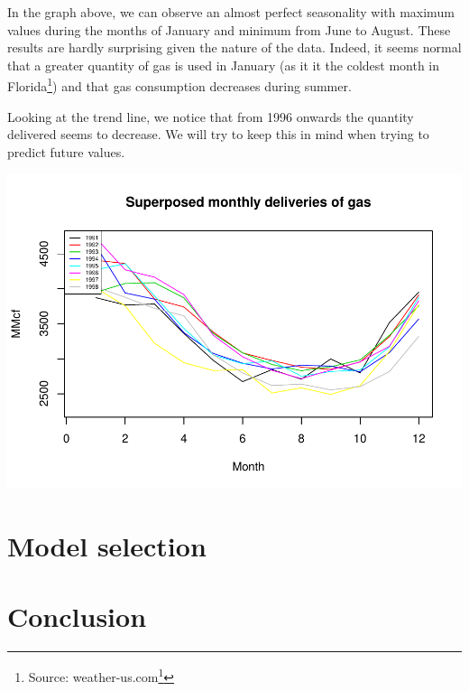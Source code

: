 \documentclass[a4paper, 12pt]{article}
\renewcommand{\href}[2]{#2\footnote{\url{#1}}}
\begin{document}
    In the graph above, we can observe an almost perfect seasonality with
    maximum values during the months of January and minimum from June to
    August. These results are hardly surprising given the nature of the
    data. Indeed, it seems normal that a greater quantity of gas is used in
    January (as it it the coldest month in Florida\footnote{\quad Source:
      \href{weather-us.com/en/florida-usa-climate}{weather-us.com}}) and
    that gas consumption decreases during summer.
    
    Looking at the trend line, we notice that from 1996 onwards the quantity
    delivered seems to decrease. We will try to keep this in mind when
    trying to predict future values.
    
    \begin{center}\includegraphics[width=0.8\linewidth]{resources/figs/unnamed-chunk-2-1} \end{center}
    
    \hypertarget{model-selection}{%
    \section{Model selection}\label{model-selection}}
    
    \hypertarget{section}{%
    \subsection{}\label{section}}
    
    \hypertarget{section-1}{%
    \subsection{}\label{section-1}}
    
    \hypertarget{conclusion}{%
    \section{Conclusion}\label{conclusion}}
    
\end{document}
